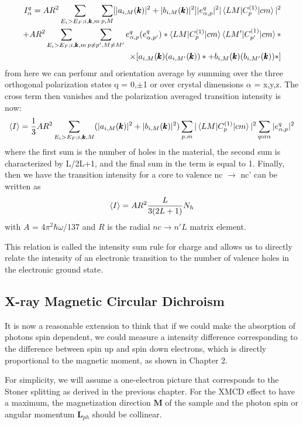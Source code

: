 \begin{align}
I_{\alpha}^q=AR^2\sum_{E_i>E_F; i ,\pmb{k}, m}\sum_{p,M}[|a_{i,M}(\pmb{k})|^2+|b_{i,M}(\pmb{k})|^2]|e_{\alpha,p}^q|^2|\braket{LM|C_p^{(1)}|cm}|^2 \\
+ AR^2\sum_{E_i>E_F; i,\pmb{k},m}\sum_{p \neq p', M \neq M'}e^q_{\alpha,p}(e^q_{\alpha,p'})*\braket{LM|C_p^{(1)}|cm}\braket{LM'|C_{p'}^{(1)}|cm}* \\
\times [a_{i,M}(\pmb{k})(a_{i,M'}(\pmb{k}))*+b_{i,M}(\pmb{k})(b_{i,M'}(\pmb{k}))*]
\end{align}
from here we can perfomr and orientation average by summing over the three orthogonal polarization states q = 0,$\pm$1 or over crystal dimensions $\alpha$ = x,y,z. The cross term then vanishes and the polarization averaged transition intensity is now:
\begin{eqnarray}
\braket{I}=\frac{1}{3}AR^2\sum_{E_i>E_F; i,\pmb{k},M}(|a_{i,M}(\pmb{k})|^2+|b_{i,M}(\pmb{k})|^2)\sum_{p,m}|\braket{LM|C_p^{(1)}|cm}|^2\sum_{q \text{or} \alpha}|e_{\alpha,p}^q|^2
\end{eqnarray}
where the first sum is the number of holes in the material, the second sum is characterized by L/2L+1, and the final sum in the term is equal to 1. Finally, then we have the transition intensity for a core to valence nc $\rightarrow$ nc' can be written as
\begin{equation}
\braket{I} = AR^2\frac{L}{3(2L+1)}N_h
\end{equation}
with $A$ = 4$\pi^2\hbar\omega/137$ and $R$ is the radial $nc\rightarrow n'L$ matrix element.

This relation is called the intensity sum rule for charge and allows us to directly relate the intensity of an electronic transition to the number of valence holes in the electronic ground state.

\subsection{X-ray Magnetic Circular Dichroism}

It is now a reasonable extension to think that if we could make the absorption of photons spin dependent, we could measure a intensity difference corresponding to the difference between spin up and spin down electrons, which is directly proportional to the magnetic moment, as shown in Chapter 2.

For simplicity, we will assume a one-electron picture that corresponds to the Stoner splitting as derived in the previous chapter. For the XMCD effect to have a maximum, the magnetization direction $\pmb{M}$ of the sample and the photon spin or angular momentum $\pmb{L}_{ph}$ should be collinear.

